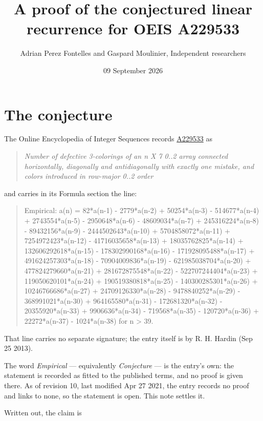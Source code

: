 \documentclass[11pt]{article}
\title{A proof of the conjectured linear recurrence for OEIS A229533}
\author{Adrian Perez Fontelles and Gaspard Moulinier, Independent researchers}
\date{09 September 2026}
\theoremstyle{definition}
\begin{document}
\maketitle
\section{The conjecture}

The Online Encyclopedia of Integer Sequences records \href{https://oeis.org/A229533}{A229533} as

\begin{quote}\itshape Number of defective 3-colorings of an n X 7 0..2 array connected horizontally, diagonally and antidiagonally with exactly one mistake, and colors introduced in row-major 0..2 order\end{quote}

and carries in its Formula section the line:

\begin{quote}\ttfamily Empirical: a(n) = 82*a(n-1) - 2779*a(n-2) + 50254*a(n-3) - 514677*a(n-4) + 2743554*a(n-5) - 2950648*a(n-6) - 48609034*a(n-7) + 245316224*a(n-8) - 89432156*a(n-9) - 2444502643*a(n-10) + 5704858072*a(n-11) + 7254972423*a(n-12) - 41716035658*a(n-13) + 18035762825*a(n-14) + 132606292618*a(n-15) - 178302990168*a(n-16) - 171928095488*a(n-17) + 491624257303*a(n-18) - 70904009836*a(n-19) - 621985038704*a(n-20) + 477824279660*a(n-21) + 281672875548*a(n-22) - 522707244404*a(n-23) + 119050620101*a(n-24) + 190519380818*a(n-25) - 140300285301*a(n-26) + 10246766686*a(n-27) + 24709126330*a(n-28) - 9478840252*a(n-29) - 368991021*a(n-30) + 964165580*a(n-31) - 172681320*a(n-32) - 20355920*a(n-33) + 9906636*a(n-34) - 719568*a(n-35) - 120720*a(n-36) + 22272*a(n-37) - 1024*a(n-38) for n > 39.\end{quote}

That line carries no separate signature; the entry itself is by R. H. Hardin (Sep 25 2013).

The word {\itshape Empirical} --- equivalently {\itshape Conjecture} --- is the entry's own: the statement is recorded as fitted to the published terms, and no proof is given there. As of revision 10, last modified Apr 27 2021, the entry records no proof and links to none, so the statement is open. This note settles it.

Written out, the claim is
\end{document}
